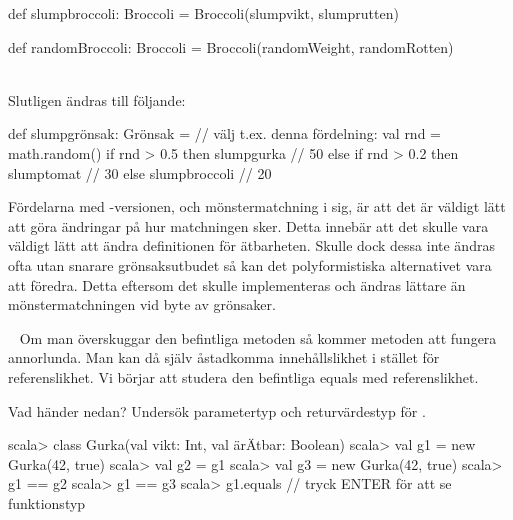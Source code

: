 \ifswedish
\begin{Code}
def slumpbroccoli: Broccoli = Broccoli(slumpvikt, slumprutten)
\end{Code}
\else
\begin{Code}
def randomBroccoli: Broccoli = Broccoli(randomWeight, randomRotten)
\end{Code}
\fi
~\\
Slutligen ändras \ifswedish{}\else{}\fi{} till följande:

\begin{Code}
def slumpgrönsak: Grönsak =     // välj t.ex. denna fördelning:
  val rnd = math.random()
  if rnd > 0.5 then slumpgurka      // 50%
  else if rnd > 0.2 then slumptomat // 30%
  else slumpbroccoli             // 20%

\end{Code}

\SubtaskSolved  Fördelarna med -versionen, och mönstermatchning i sig, är att det är väldigt lätt att göra ändringar på hur matchningen sker. Detta innebär att det skulle vara väldigt lätt att ändra definitionen för ätbarheten. Skulle dock dessa inte ändras ofta utan snarare grönsaksutbudet så kan det polyformistiska alternativet vara att föredra. Detta eftersom det skulle implementeras och ändras lättare än mönstermatchningen vid byte av grönsaker.



\QUESTEND






\QUESTBEGIN

\Task  \what~   Om man överskuggar den befintliga metoden  så kommer metoden \code{==} att fungera annorlunda. Man kan då själv åstadkomma innehållslikhet i stället för referenslikhet. Vi börjar att studera den befintliga equals med referenslikhet.

\Subtask \label{subtask:refequals} Vad händer nedan? Undersök parametertyp och returvärdestyp för  .
\begin{REPL}
scala> class Gurka(val vikt: Int, val ärÄtbar: Boolean)
scala> val g1 = new Gurka(42, true)
scala> val g2 = g1
scala> val g3 = new Gurka(42, true)
scala> g1 == g2
scala> g1 == g3
scala> g1.equals  // tryck ENTER för att se funktionstyp
\end{REPL}

